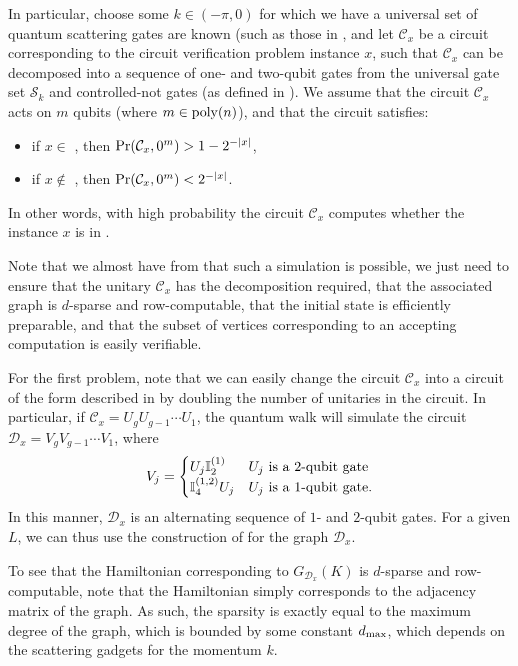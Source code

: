 \documentclass[../thesis-main/thesis-main]{subfiles}
\begin{document}
In particular, choose some $k\in (-\pi,0)$ for which we have a universal set of quantum scattering gates are known (such as those in , and let $\mathcal{C}_x$ be a circuit corresponding to the circuit verification problem instance $x$, such that $\mathcal{C}_x$ can be decomposed into a sequence of one- and two-qubit gates from the universal gate set $\mathcal{S}_{k}$ and controlled-not gates (as defined in ).  We assume that the circuit $\mathcal{C}_x$ acts on $m$ qubits (where $m\in \operatorname{poly}(n)$), and that the circuit satisfies:
\begin{itemize}
  \item if $x\in$ \QCircVer, then $\operatorname{Pr}(\mathcal{C}_x,0^m) > 1-2^{-|x|}$,
  \item if $x\notin$ \QCircVer, then $\operatorname{Pr}(\mathcal{C}_x,0^m) < 2^{-|x|}$.
\end{itemize}
In other words, with high probability the circuit $\mathcal{C}_x$ computes whether the instance $x$ is in \QCircVer.

Note that we almost have from  that such a simulation is possible, we just need to ensure that the unitary $\mathcal{C}_x$ has the decomposition required, that the associated graph is $d$-sparse and row-computable, that the initial state is efficiently preparable, and that the subset of vertices corresponding to an accepting computation is easily verifiable.

For the first problem, note that we can easily change the circuit $\mathcal{C}_x$ into a circuit of the form described in  by doubling the number of unitaries in the circuit.  In particular, if $\mathcal{C}_x = U_g U_{g-1} \cdots U_{1}$, the quantum walk will simulate the circuit $\mathcal{D}_x = V_g V_{g-1} \cdots V_1$, where 
\begin{align}
  V_j = \begin{cases}
    U_j \mathbb{I}^{(1)}_{2} & U_j \text{ is a 2-qubit gate}\\
    \mathbb{I}_{4}^{(1,2)} U_j & U_j \text{ is a 1-qubit gate}.
  \end{cases}
\end{align}
In this manner, $\mathcal{D}_x$ is an alternating sequence of $1$- and $2$-qubit gates.  For a given $L$, we can thus use the construction of  for the graph $\mathcal{D}_x$.

To see that the Hamiltonian corresponding to $G_{\mathcal{D}_x}(K)$ is $d$-sparse and row-computable, note that the Hamiltonian simply corresponds to the adjacency matrix of the graph.  As such, the sparsity is exactly equal to the maximum degree of the graph, which is bounded by some constant $d_{\text{max}}$, which depends on the scattering gadgets for the momentum $k$. 
\end{document}
